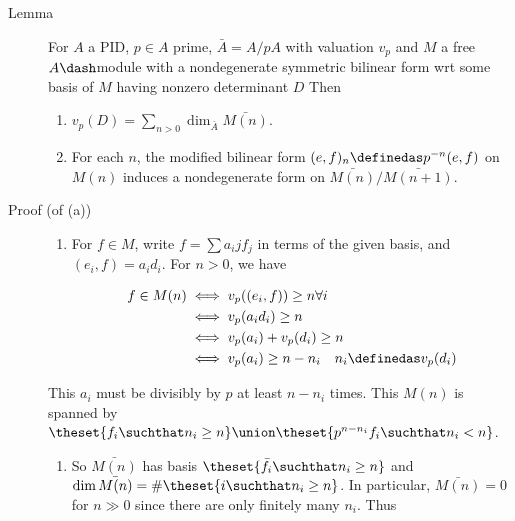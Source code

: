 \begin{description}
\item[Lemma]
For \(A\) a PID, \(p\in A\) prime, \(\bar A = A/pA\) with valuation
\(v_p\) and \(M\) a free \(A\dash\)module with a nondegenerate symmetric
bilinear form wrt some basis of \(M\) having nonzero determinant \(D\)
Then

\begin{enumerate}
\def\labelenumi{\alph{enumi}.}
\tightlist
\item
  \(v_p(D) = \sum_{n > 0} \dim_{\bar A} \bar{M(n)}\).
\item
  For each \(n\), the modified bilinear form
  \((e, f)_n \definedas p^{-n} (e, f)\) on \(M(n)\) induces a
  nondegenerate form on \(\bar{M(n)} / \bar{M(n+1)}\).
\end{enumerate}
\item[Proof (of (a))]
\hfill

\begin{enumerate}
\def\labelenumi{\arabic{enumi}.}
\tightlist
\item
  For \(f\in M\), write \(f = \sum a_ij f_j\) in terms of the given
  basis, and \((e_i, f) = a_i d_i\). For \(n> 0\), we have

  \begin{center}
    \begin{align*}
    f \in M(n) & \iff v_p((e_i, f)) \geq n \forall i \\
    & \iff v_p(a_i d_i) \geq n \\
    & \iff v_p(a_i) + v_p(d_i) \geq n \\
    & \iff v_p(a_i) \geq n - n_i \quad n_i \definedas v_p(d_i)
    \end{align*}
    \end{center}
\end{enumerate}

This \(a_i\) must be divisibly by \(p\) at least \(n-n_i\) times. This
\(M(n)\) is spanned by
\(\theset{f_i \suchthat n_i \geq n} \union \theset{p^{n-n_i}f_i \suchthat n_i < n}\).

\begin{enumerate}
\def\labelenumi{\arabic{enumi}.}
\setcounter{enumi}{1}
\tightlist
\item
  So \(\bar{M(n)}\) has basis \(\theset{\bar f_i \suchthat n_i \geq n}\)
  and \(\dim \bar{M(n)} = \# \theset{i \suchthat n_i \geq n}\). In
  particular, \(\bar{M(n)} = 0\) for \(n\gg 0\) since there are only
  finitely many \(n_i\). Thus
\end{enumerate}


\end{description}
